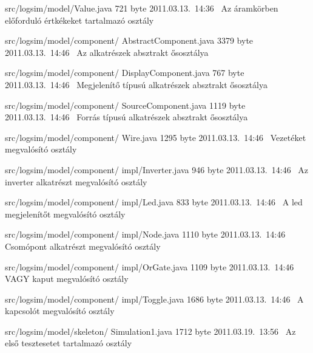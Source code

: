 \begin{fajllista}
\fajl
{src/logsim/model/Value.java} %
{721 byte} %
{2011.03.13.~14:36~} %
{Az áramkörben előforduló értkékeket tartalmazó osztály} %

\fajl
{src/logsim/model/component/\newline
AbstractComponent.java} %
{3379 byte} %
{2011.03.13.~14:46~} %
{Az alkatrészek absztrakt ősosztálya} %

\fajl
{src/logsim/model/component/\newline
DisplayComponent.java} %
{767 byte} %
{2011.03.13.~14:46~} %
{Megjelenítő típusú alkatrészek absztrakt ősosztálya} %

\fajl
{src/logsim/model/component/\newline
SourceComponent.java} %
{1119 byte} %
{2011.03.13.~14:46~} %
{Forrás típusú alkatrészek absztrakt ősosztálya} %

\fajl
{src/logsim/model/component/\newline
Wire.java} %
{1295 byte} %
{2011.03.13.~14:46~} %
{Vezetéket megvalósító osztály} %

\fajl
{src/logsim/model/component/\newline
impl/Inverter.java} %
{946 byte} %
{2011.03.13.~14:46~} %
{Az inverter alkatrészt megvalósító osztály} %

\fajl
{src/logsim/model/component/\newline
impl/Led.java} %
{833 byte} %
{2011.03.13.~14:46~} %
{A led megjelenítőt megvalósító osztály} %

\fajl
{src/logsim/model/component/\newline
impl/Node.java} %
{1110 byte} %
{2011.03.13.~14:46~} %
{Csomópont alkatrészt megvalósító osztály} %

\fajl
{src/logsim/model/component/\newline
impl/OrGate.java} %
{1109 byte} %
{2011.03.13.~14:46~} %
{VAGY kaput megvalósító osztály} %

\fajl
{src/logsim/model/component/\newline
impl/Toggle.java} %
{1686 byte} %
{2011.03.13.~14:46~} %
{A kapcsolót megvalósító osztály} %

\fajl
{src/logsim/model/skeleton/\newline
Simulation1.java} %
{1712 byte} %
{2011.03.19.~13:56~} %
{Az első tesztesetet tartalmazó osztály} %


\end{fajllista}
